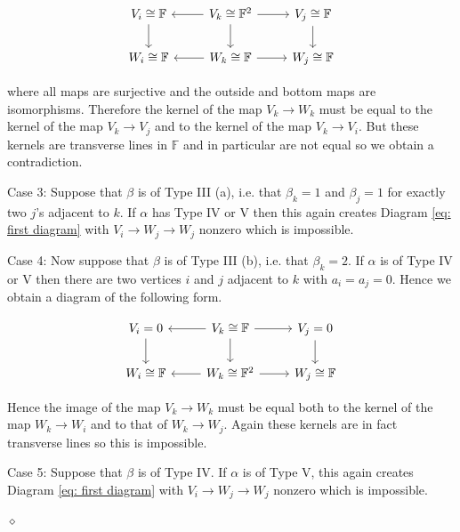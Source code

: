 \documentclass{article}
\newenvironment{proof}{\vspace*{2ex}\noindent {\em Proof:}
}{\hfill $\diamond$ \\[2ex]}
\begin{document}
\begin{proof}
\begin{equation}\label{eq: second diagram}
\begin{tikzcd}
V_i \cong \mathbb{F} \arrow[d]  & V_k \cong \mathbb{F}^2 \arrow[l]  \arrow[d] \arrow[r] & V_j \cong \mathbb{F} \arrow[d]  
\\ W_i \cong \mathbb{F} & W_k \cong \mathbb{F} \arrow[l] \arrow[r]  & W_j \cong \mathbb{F}
\end{tikzcd}
\end{equation}

where all maps are surjective and the outside and bottom maps are isomorphisms. Therefore the kernel of the map $V_k \to W_k$ must be equal to the kernel of the map $V_k \to V_j$ and to the kernel of the map $V_k \to V_i$. But these kernels are transverse lines in $\mathbb{F}$ and in particular are not equal so we obtain a contradiction. 

Case 3: Suppose that $\beta$ is of Type III (a), i.e. that $\beta_k=1$ and $\beta_j=1$ for exactly two $j$'s adjacent to $k$. If $\alpha$ has Type IV or V then this again creates Diagram \ref{eq: first diagram} with $V_i \to W_j \to W_j$ nonzero which is impossible.

Case 4: Now suppose that $\beta$ is of Type III (b), i.e. that $\beta_k = 2$. If $\alpha$ is of Type IV or V then there are two vertices $i$ and $j$ adjacent to $k$ with $a_i = a_j = 0$. Hence we obtain a diagram of the following form. 

\begin{equation}\label{eq: two zeros mapping to thick}
\begin{tikzcd}
V_i = 0 \arrow[d]  & V_k \cong \mathbb{F} \arrow[l]  \arrow[d] \arrow[r] & V_j = 0 \arrow[d]  
\\ W_i \cong \mathbb{F} & W_k \cong \mathbb{F}^2 \arrow[l] \arrow[r]  & W_j \cong \mathbb{F}
\end{tikzcd}
\end{equation}


Hence the image of the map $V_k \to W_k$ must be equal both to the kernel of the map $W_k \to W_i$ and to that of $W_k \to W_j$. Again these kernels are in fact transverse lines so this is impossible.  

Case 5: Suppose that $\beta$ is of Type IV. If $\alpha$ is of Type V, this again creates Diagram \ref{eq: first diagram} with $V_i \to W_j \to W_j$ nonzero which is impossible.


\end{proof}
\end{document}
